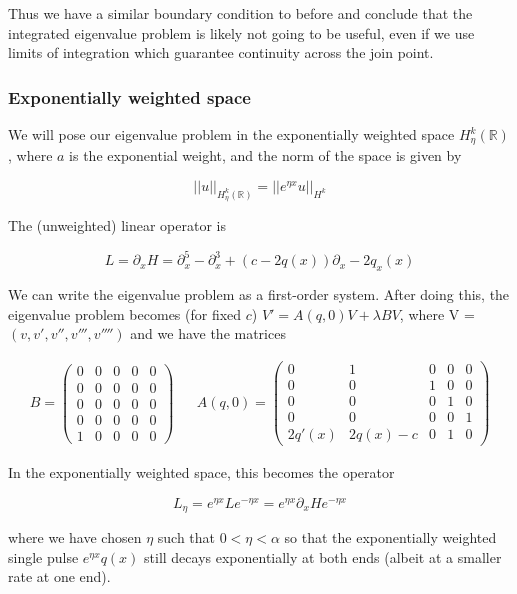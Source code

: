 \documentclass[12pt]{article}
\def\R{{\mathbb R}}
\begin{document}
Thus we have a similar boundary condition to before and conclude that the integrated eigenvalue problem is likely not going to be useful, even if we use limits of integration which guarantee continuity across the join point.

\subsubsection*{Exponentially weighted space}

We will pose our eigenvalue problem in the exponentially weighted space $H_\eta^k(\R)$, where $a$ is the exponential weight, and the norm of the space is given by

\[
||u||_{H_\eta^k(\R)} = ||e^{\eta x}u||_{H^k}
\]

The (unweighted) linear operator is

\[
L = \partial_x H = \partial_x^5 - \partial_x^3 + (c - 2q(x))\partial_x - 2 q_x(x)
\]

We can write the eigenvalue problem as a first-order system. After doing this, the eigenvalue problem becomes (for fixed $c$) $V' = A(q, 0)V + \lambda B V$, where V = $(v, v', v'', v''', v'''')$ and we have the matrices

\begin{align*}
B = \begin{pmatrix}0 & 0 & 0 & 0 & 0 \\0 & 0 & 0 & 0 & 0 \\0  & 0 & 0 & 0 & 0 \\0 & 0 & 0 & 0 & 0 \\1 & 0 & 0 & 0 & 0 \end{pmatrix} && 
A(q, 0) = \begin{pmatrix}0 & 1 & 0 & 0 & 0 \\0 & 0 & 1 & 0 & 0 \\0 & 0 & 0 & 1 & 0 \\0 & 0 & 0 & 0 & 1 \\
2q'(x) & 2q(x) - c & 0 & 1 & 0 \end{pmatrix} 
\end{align*}

In the exponentially weighted space, this becomes the operator

\[
L_\eta = e^{\eta x} L e^{-\eta x} = e^{\eta x} \partial_x H e^{-\eta x}
\]

where we have chosen $\eta$ such that $0 < \eta < \alpha$ so that the exponentially weighted single pulse $e^{\eta x} q(x)$ still decays exponentially at both ends (albeit at a smaller rate at one end).\\
\end{document}
